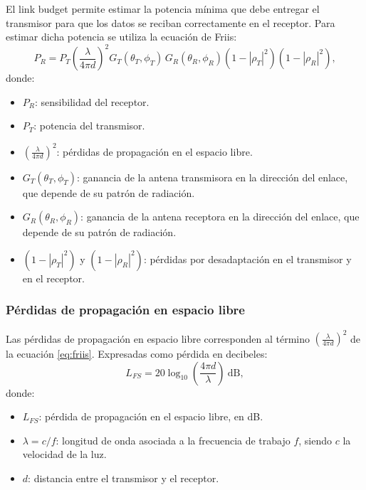 \documentclass[12pt,a4paper]{article}
\begin{document}
El link budget permite estimar la potencia mínima que debe entregar el transmisor para que los datos se reciban correctamente en el receptor. Para estimar dicha potencia se utiliza la ecuación de Friis:
\begin{equation}
  P_R = P_T \left(\frac{\lambda}{4\pi d}\right)^{2} G_T(\theta_T,\phi_T) \, G_R(\theta_R,\phi_R) \left(1-|\rho_T|^{2}\right)\left(1-|\rho_R|^{2}\right),
  \label{eq:friis}
\end{equation}
donde:
\begin{itemize}
\item $P_R$: sensibilidad del receptor.
\item $P_T$: potencia del transmisor.
\item $\left(\frac{\lambda}{4\pi d}\right)^{2}$: pérdidas de propagación en el espacio libre.
\item $G_T(\theta_T,\phi_T)$: ganancia de la antena transmisora en la dirección del enlace, que depende de su patrón de radiación.
\item $G_R(\theta_R,\phi_R)$: ganancia de la antena receptora en la dirección del enlace, que depende de su patrón de radiación.
\item $\left(1-|\rho_T|^{2}\right)$ y $\left(1-|\rho_R|^{2}\right)$: pérdidas por desadaptación en el transmisor y en el receptor.
\end{itemize}

\subsubsection{Pérdidas de propagación en espacio libre}

Las pérdidas de propagación en espacio libre corresponden al término $\left(\frac{\lambda}{4\pi d}\right)^{2}$ de la ecuación \eqref{eq:friis}. Expresadas como pérdida en decibeles:
\begin{equation}
  L_{FS} = 20\log_{10}\left(\frac{4\pi d}{\lambda}\right) \ \text{dB},
  \label{eq:fspl-db}
\end{equation}
donde:
\begin{itemize}
\item $L_{FS}$: pérdida de propagación en el espacio libre, en dB.
\item $\lambda = c/f$: longitud de onda asociada a la frecuencia de trabajo $f$, siendo $c$ la velocidad de la luz.
\item $d$: distancia entre el transmisor y el receptor.
\end{itemize}
\end{document}
